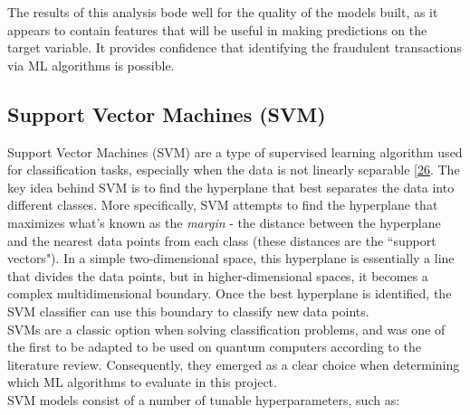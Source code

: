 \documentclass[11pt, oneside]{article}   	%
\begin{document}
The results of this analysis bode well for the quality of the models built, as it appears to contain features that will be useful in making predictions on the target variable. It provides confidence that identifying the fraudulent transactions via ML algorithms is possible.



\subsection{Support Vector Machines (SVM)}

Support Vector Machines (SVM) are a type of supervised learning algorithm used for classification tasks, especially when the data is not linearly separable [\href{https://link.springer.com/book/10.1007/978-1-4757-3264-1}{26}. The key idea behind SVM is to find the hyperplane that best separates the data into different classes. More specifically, SVM attempts to find the hyperplane that maximizes what's known as the \textit{margin} - the distance between the hyperplane and the nearest data points from each class (these distances are the ``support vectors"). In a simple two-dimensional space, this hyperplane is essentially a line that divides the data points, but in higher-dimensional spaces, it becomes a complex multidimensional boundary. Once the best hyperplane is identified, the SVM classifier can use this boundary to classify new data points.\\

SVMs are a classic option when solving classification problems, and was one of the first to be adapted to be used on quantum computers according to the literature review. Consequently, they emerged as a clear choice when determining which ML algorithms to evaluate in this project. \\

SVM models consist of a number of tunable hyperparameters, such as:
\end{document}
